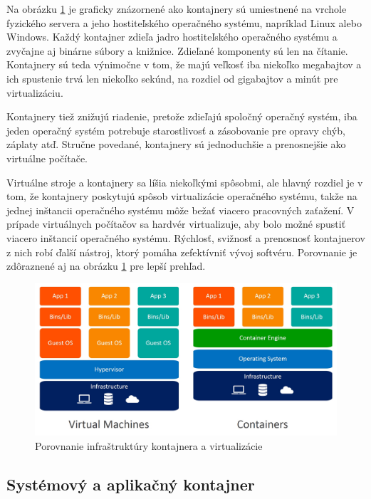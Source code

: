 Na obrázku \ref{kontaj} je graficky znázornené ako kontajnery sú umiestnené na vrchole fyzického servera a jeho hostiteľského operačného systému, napríklad Linux alebo Windows. Každý kontajner zdieľa jadro hostiteľského operačného systému a zvyčajne aj binárne súbory a knižnice. Zdieľané komponenty sú len na čítanie. Kontajnery sú teda výnimočne v tom, že majú veľkosť iba niekoľko megabajtov a ich spustenie trvá len niekoľko sekúnd, na rozdiel od gigabajtov a minút pre virtualizáciu.

Kontajnery tiež znižujú riadenie, pretože zdieľajú spoločný operačný systém, iba jeden operačný systém potrebuje starostlivosť a zásobovanie pre opravy chýb, záplaty atď. Stručne povedané, kontajnery sú jednoduchšie a prenosnejšie ako virtuálne počítače.

Virtuálne stroje a kontajnery sa líšia niekoľkými spôsobmi, ale hlavný rozdiel je v tom, že kontajnery poskytujú spôsob virtualizácie operačného systému, takže na jednej inštancii operačného systému môže bežať viacero pracovných zaťažení. V prípade virtuálnych počítačov sa hardvér virtualizuje, aby bolo možné spustiť viacero inštancií operačného systému. Rýchlosť, svižnosť a prenosnosť kontajnerov z nich robí ďalší nástroj, ktorý pomáha zefektívniť vývoj softvéru. Porovnanie je zdôraznené aj na obrázku \ref{kontaj} pre lepší prehľad.

\begin{figure}[!h]
    \centering
    \includegraphics[width=1\linewidth]{figures/containervsvirtual}
    \caption{Porovnanie infraštruktúry kontajnera a virtualizácie \cite{containervsvirtual}}
	\label{kontaj}
\end{figure}

\subsection{Systémový a aplikačný kontajner}

